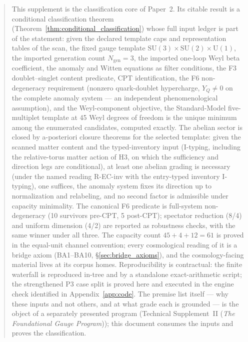 \documentclass[11pt]{article}
\theoremstyle{definition}
\newcommand{\SU}{\mathrm{SU}}
\newcommand{\U}{\mathrm{U}}
\newcommand{\TSII}{Technical Supplement~II (\emph{The Foundational Gauge Program})}
\begin{document}
\begin{abstract}
\noindent
This supplement is the classification core of Paper~2.  Its citable
result is a conditional classification theorem
(Theorem~\ref{thm:conditional_classification}) whose full input ledger
is part of the statement: given the declared template caps and
representation tables of the scan, the fixed gauge template
$\SU(3)\times\SU(2)\times\U(1)$, the imported generation count
$N_{\mathrm{gen}}=3$, the imported one-loop Weyl beta coefficient, the
anomaly and Witten equations as filter conditions, the F3
doublet--singlet content predicate, CPT identification,
the F6 non-degeneracy requirement (nonzero quark-doublet
hypercharge, $Y_Q \neq 0$ on the complete anomaly system --- an
independent phenomenological assumption), and the Weyl-component objective, the Standard-Model five-multiplet template at 45 Weyl
degrees of freedom is the unique minimum among the enumerated
candidates, computed exactly.  The abelian sector is closed by
a-posteriori closure theorems for the selected template: given the
scanned matter content and the typed-inventory input (I-typing,
including the relative-torus matter action of H3, on which the
sufficiency and direction legs are conditional), at least one abelian
grading is necessary
(under the named reading R-EC-inv with the entry-typed inventory
I-typing), one suffices, the anomaly system fixes its direction up to
normalization and relabeling, and no second factor is admissible under
capacity minimality.  The canonical F6 predicate is full-system
non-degeneracy (10 survivors pre-CPT, 5 post-CPT); spectator reduction
(8/4) and uniform dimension (4/2) are reported as robustness checks,
with the same winner under all three.  The capacity count
$45+4+12=61$ is proved in the equal-unit channel convention; every
cosmological reading of it is a bridge axiom (BA1--BA10,
\S\ref{sec:bridge_axioms}), and the cosmology-facing material lives at
its corpus homes.  Reproducibility is contractual: the finite waterfall is reproduced
in-tree and by a standalone exact-arithmetic script; the strengthened
P3 case split is proved here and executed in the engine check identified
in Appendix~\ref{app:code}.  The premise list itself --- why
these inputs and not others, and at what grade each is grounded --- is
the object of a separately presented program (\TSII); this document
consumes the inputs and proves the classification.
\end{abstract}
\end{document}
